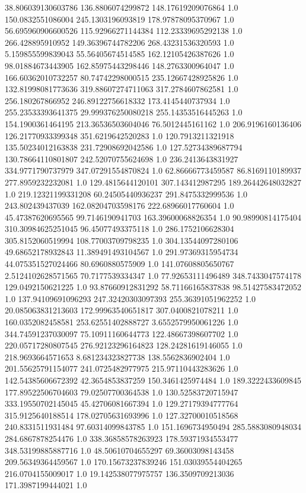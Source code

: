 38.806039130603786	136.8806074299872	148.17619209076864	1.0
150.0832551086004	245.1303196093819	178.97878095370967	1.0
56.695960906600526	115.92966271144384	112.23339695292138	1.0
266.428895910952	149.36396744782206	268.43231536320593	1.0
5.159855599839043	55.56405674514585	162.12105426387626	1.0
98.01884673443905	162.85975443298446	148.2763300964047	1.0
166.60362010732257	80.74742298000515	235.12667428925826	1.0
132.81998081773636	319.88607274711063	317.2784607862581	1.0
256.180267866952	246.89122756618332	173.4145440737934	1.0
255.23533393641375	29.999376250080218	255.14353516445263	1.0
154.1900361464195	213.36536503604046	76.5012445161162	1.0
206.9196160136406	126.21770933399348	351.6219642520283	1.0
120.7913211321918	135.50234012163838	231.72908692042586	1.0
127.52734389687794	130.78664110801807	242.52070755624698	1.0
236.2413643831927	334.9771790737979	347.07291554870824	1.0
62.86666773459587	86.8169110189937	277.8959232232081	1.0
129.4815644120101	307.143412987295	189.26442648032827	1.0
219.12321199331208	60.24505440936237	291.8475332999536	1.0
243.802439437039	162.08204703598176	222.68966017760604	1.0
45.47387620695565	99.7146190941703	163.39600068826354	1.0
90.98990814175404	310.30984625251045	96.45077493375118	1.0
286.1752106628304	305.8152060519994	108.77003709798235	1.0
304.13544097280106	49.68652178932843	11.389491493104567	1.0
291.97369315954734	44.075351527024466	80.6960880575909	1.0
141.07608805650767	2.5124102628571565	70.7177539334347	1.0
77.92653111496489	348.7433047574178	129.0492150621225	1.0
93.87660912831292	58.71166165837838	98.51427583472052	1.0
137.94109691096293	247.32420303097393	255.36391051962252	1.0
20.085063831213603	172.99963540651817	307.0400821078211	1.0
160.0352082458581	253.62551402888727	3.6552579950061226	1.0
344.74591237030097	75.10911160644773	122.48667398607702	1.0
220.05717280807545	276.92123296164823	128.24281619146055	1.0
218.9693664571653	8.681234323827738	138.5562836902404	1.0
201.55625791154077	241.0725482977975	215.97110443283626	1.0
142.54385606672392	42.3654853837259	150.3461425974484	1.0
189.3222433609845	177.89522506704603	79.02507700364538	1.0
130.52583720715947	333.19550702145045	45.42706081667394	1.0
129.27179394777764	315.9125640188514	178.02705631693996	1.0
127.32700010518568	240.8331511931484	97.60314099843785	1.0
151.1696734950494	285.5883080948034	284.6867878254476	1.0
338.36858578263923	178.59371934553477	348.53199885887716	1.0
48.50610704655297	69.36003098143458	209.56349364459567	1.0
170.15673237839246	151.03039554404265	216.0704155009017	1.0
19.142538077975757	136.3509709213036	171.3987199444021	1.0
